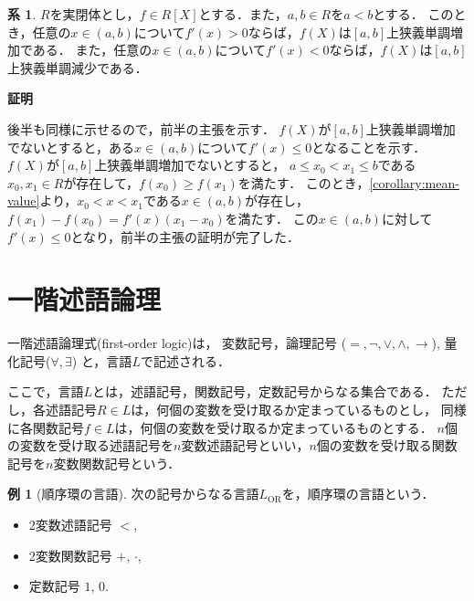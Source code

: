\documentclass[uplatex, dvipdfmx]{jsarticle}
\makeatletter
\numberwithin{equation}{section}
\renewenvironment{proof}[1][\proofname]{\par
  \pushQED{\qed}%
  \normalfont \topsep6\p@\@plus6\p@\relax
  \trivlist
  \item\relax
  {\bfseries
  #1\@addpunct{.}}\hspace\labelsep\ignorespaces
}{
  \popQED\endtrivlist\@endpefalse
}
\theoremstyle{definition}
\newtheorem{corollary}[definition]{系}
\newtheorem{example}[definition]{例}
\renewcommand{\proofname}{\textbf{証明}}
\makeatother
\begin{document}
\begin{corollary}\label{corollary:monotone}
     $R$を実閉体とし，$f \in R[X]$とする．また，$a, b \in R$を$a<b$とする．
     このとき，任意の$x \in (a,b)$について$f'(x)>0$ならば，$f(X)$は$[a,b]$上狭義単調増加である．
     また，任意の$x \in (a,b)$について$f'(x)<0$ならば，$f(X)$は$[a,b]$上狭義単調減少である．
\end{corollary}
\begin{proof}
     後半も同様に示せるので，前半の主張を示す．
     $f(X)$が$[a,b]$上狭義単調増加でないとすると，ある$x \in (a,b)$について$f'(x) \leq 0$となることを示す．
     $f(X)$が$[a,b]$上狭義単調増加でないとすると，
     $a \leq x_0 < x_1 \leq b$である$x_0, x_1 \in R$が存在して，$f(x_0) \geq f(x_1)$を満たす．
     このとき，\cref{corollary:mean-value}より，$x_0 < x < x_1$である$x \in (a,b)$が存在し，
     $f(x_1) - f(x_0) = f'(x)(x_1 - x_0)$を満たす．
     この$x \in (a,b)$に対して$f'(x) \leq 0$となり，前半の主張の証明が完了した．
\end{proof}

\section{一階述語論理}
一階述語論理式(first-order logic)は，
変数記号，論理記号 ($=, \lnot, \lor, \land, \rightarrow$), 量化記号($\forall, \exists$)
と，言語$L$で記述される．

ここで，言語$L$とは，述語記号，関数記号，定数記号からなる集合である．
ただし，各述語記号$R \in L$は，何個の変数を受け取るか定まっているものとし，
同様に各関数記号$f \in L$は，何個の変数を受け取るか定まっているものとする．
$n$個の変数を受け取る述語記号を$n$変数述語記号といい，$n$個の変数を受け取る関数記号を$n$変数関数記号という．

\begin{example}[順序環の言語]
     次の記号からなる言語$L_\mathrm{OR}$を，順序環の言語という．
     \begin{itemize}
          \item 2変数述語記号 $<$,
          \item 2変数関数記号 $+$, $\cdot$,
          \item 定数記号 $1$, $0$.
     \end{itemize}
\end{example}
\end{document}

